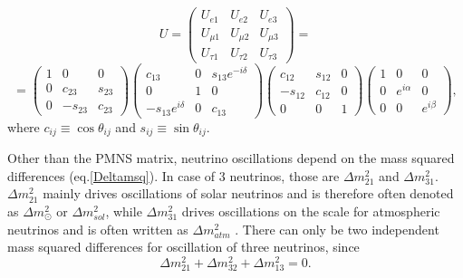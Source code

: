 \[
U=
\begin{pmatrix}
 U_{e1}     & U_{e2}     & U_{e3}    \\
 U_{\mu 1}  & U_{\mu 2}  & U_{\mu 3} \\
 U_{\tau 1} & U_{\tau 2} & U_{\tau 3}
\end{pmatrix}
=
\]
\begin{equation}\label{param3}
=
\begin{pmatrix}
 1 & 0       & 0      \\
 0 & c_{23}  & s_{23} \\
 0 & -s_{23} & c_{23}
\end{pmatrix}
\begin{pmatrix}
 c_{13}              & 0 & s_{13}e^{-i\delta} \\
 0                   & 1 & 0                  \\
 -s_{13}e^{i\delta} & 0 & c_{13}
\end{pmatrix}
\begin{pmatrix}
 c_{12}  & s_{12} & 0 \\
 -s_{12} & c_{12} & 0 \\
 0       & 0      & 1
\end{pmatrix}
\begin{pmatrix}
 1 & 0           & 0 \\
 0 & e^{i\alpha} & 0 \\
 0 & 0           & e^{i\beta}
\end{pmatrix},
\end{equation}
where $c_{ij}\equiv\cos\theta_{ij}$ and $s_{ij}\equiv\sin\theta_{ij}$.

Other than the PMNS matrix, neutrino oscillations depend on the mass squared differences (eq.\ref{Deltamsq}). In case of 3 neutrinos, those are $\Delta m^2_{21}$ and $\Delta m^2_{31}$. $\Delta m^2_{21}$ mainly drives oscillations of solar neutrinos and is therefore often denoted as $\Delta m^2_{\odot}$ or $\Delta m^2_{sol}$, while $\Delta m^2_{31}$ drives oscillations on the scale for atmospheric neutrinos  and is often written as $\Delta m^2_{atm}$ \cite{Gonzalez-GarciaNuMassesAndMixing.pdf}. There can only be two independent mass squared differences for oscillation of three neutrinos, since 
\begin{equation}
\Delta m^2_{21} + \Delta m^2_{32} + \Delta m^2_{13} = 0.
\end{equation}

